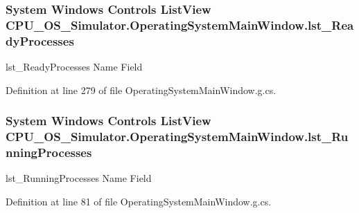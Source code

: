 \subsubsection[{lst\+\_\+\+Ready\+Processes}]{\setlength{\rightskip}{0pt plus 5cm}System Windows Controls List\+View C\+P\+U\+\_\+\+O\+S\+\_\+\+Simulator.\+Operating\+System\+Main\+Window.\+lst\+\_\+\+Ready\+Processes}\label{class_c_p_u___o_s___simulator_1_1_operating_system_main_window_a00397da2e841d089d65441f5d4f19915}


lst\+\_\+\+Ready\+Processes Name Field 



Definition at line 279 of file Operating\+System\+Main\+Window.\+g.\+cs.

\hypertarget{class_c_p_u___o_s___simulator_1_1_operating_system_main_window_a8710fe75e8464b39764d29184c2510fd}{}
\subsubsection[{lst\+\_\+\+Running\+Processes}]{\setlength{\rightskip}{0pt plus 5cm}System Windows Controls List\+View C\+P\+U\+\_\+\+O\+S\+\_\+\+Simulator.\+Operating\+System\+Main\+Window.\+lst\+\_\+\+Running\+Processes}\label{class_c_p_u___o_s___simulator_1_1_operating_system_main_window_a8710fe75e8464b39764d29184c2510fd}


lst\+\_\+\+Running\+Processes Name Field 



Definition at line 81 of file Operating\+System\+Main\+Window.\+g.\+cs.

\hypertarget{class_c_p_u___o_s___simulator_1_1_operating_system_main_window_a70185c0d33e102e203d76b79ac5c77db}{}
